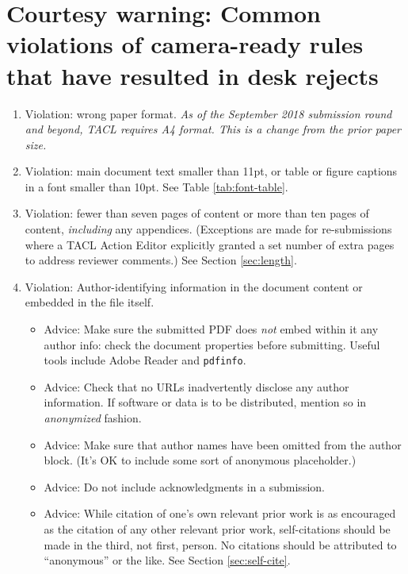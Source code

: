 \documentclass[11pt,a4paper]{article}
\newcommand{\taclpaper}{camera-ready\xspace}
\newcommand{\taclpaper}{submission\xspace}
\begin{document}
\section{Courtesy warning: Common violations of \taclpaper rules that have
resulted in desk
rejects}
\begin{enumerate}
  \item Violation: wrong paper format.
  \emph{As of the September 2018 submission round and beyond, TACL requires A4
  format.  This is a change from the prior paper size.}

  \item Violation: main document text smaller than 11pt, or table or figure
  captions in a font smaller than 10pt. See Table \ref{tab:font-table}.

  \item Violation: fewer than seven pages of content or more than ten pages of
  content, {\em including} any appendices. (Exceptions are made for
  re-submissions where a TACL Action Editor explicitly granted a set number of
  extra pages to address reviewer comments.) See
  Section \ref{sec:length}.
  \item Violation: Author-identifying information in the document content or
  embedded in the file itself.
    \begin{itemize}
      \item Advice: Make sure the submitted PDF does \emph{not} embed within it
      any author info: check the document properties before submitting.
      Useful tools include Adobe Reader and {\tt pdfinfo}.
      \item Advice: Check that no URLs inadvertently disclose any author
      information. If software or data is to be distributed, mention so in
      {\em anonymized} fashion.
      \item Advice: Make sure that author names have been omitted
      from the author block. (It's OK to include some sort of anonymous
      placeholder.)
      \item Advice: Do not include acknowledgments in a submission.
      \item Advice: While citation of one's own relevant prior work is as
      encouraged as the citation of any other relevant prior work,
      self-citations should be made in the third, not first, person.
      No citations should be attributed to ``anonymous'' or the like.
      See Section \ref{sec:self-cite}.
    \end{itemize}
\end{enumerate}
\fi
\end{document}
